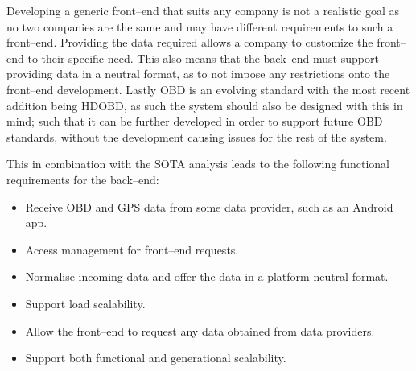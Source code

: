 Developing a generic front--end that suits any company is not a realistic goal as no two companies are the same and may have different requirements to such a front--end.
Providing the data required allows a company to customize the front--end to their specific need.
This also means that the back--end must support providing data in a neutral format, as to not impose any restrictions onto the front--end development.
Lastly \ac{OBD} is an evolving standard with the most recent addition being \ac{HDOBD}, as such the system should also be designed with this in mind; such that it can be further developed in order to support future \ac{OBD} standards, without the development causing issues for the rest of the system.

\bigskip \noindent
This in combination with the SOTA analysis leads to the following functional requirements for the back--end:
\begin{itemize}
    \item Receive \ac{OBD} and GPS data from some data provider, such as an Android app.
    \item Access management for front--end requests.
    \item Normalise incoming data and offer the data in a platform neutral format. %
    \item Support load scalability.%
    \item Allow the front--end to request any data obtained from data providers.
    \item Support both functional and generational scalability.
\end{itemize}



